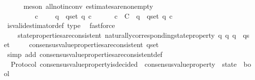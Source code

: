 \begin{isabellebody}
\ \ \ \ \isamarkupfalse%
\ {\isacharparenleft}meson\ all{\isacharunderscore}not{\isacharunderscore}in{\isacharunderscore}conv\ estimates{\isacharunderscore}are{\isacharunderscore}non{\isacharunderscore}empty{\isacharparenright}\isanewline
\ \ \isamarkupfalse%
\ \isamarkupfalse%
\isanewline
\ \ \ \ {\isachardoublequoteopen}{\isacharparenleft}{\isasymexists}\ {\isasymsigma}\ {\isasymin}\ {\isasymSigma}{\isachardot}\ {\isasymexists}\ c\ {\isasymin}\ {\isasymepsilon}\ {\isasymsigma}{\isachardot}\ {\isasymforall}\ q\ {\isasymin}\ q{\isacharunderscore}set{\isachardot}\ q\ c{\isacharparenright}\isanewline
\ \ \ \ {\isasymlongrightarrow}\ {\isacharparenleft}{\isasymexists}\ c\ {\isasymin}\ C{\isachardot}\ {\isasymforall}\ q{\isacharprime}\ {\isasymin}\ q{\isacharunderscore}set{\isachardot}\ q{\isacharprime}\ c{\isacharparenright}{\isachardoublequoteclose}\isanewline
\ \ \ \ \isamarkupfalse%
\ is{\isacharunderscore}valid{\isacharunderscore}estimator{\isacharunderscore}def\ {\isasymepsilon}{\isacharunderscore}type\ \isamarkupfalse%
\ fastforce\isanewline
\ \ \isamarkupfalse%
\ \isamarkupfalse%
\isanewline
\ \ \ \ {\isachardoublequoteopen}state{\isacharunderscore}properties{\isacharunderscore}are{\isacharunderscore}consistent\ {\isacharbraceleft}naturally{\isacharunderscore}corresponding{\isacharunderscore}state{\isacharunderscore}property\ q\ {\isacharbar}q{\isachardot}\ q\ {\isasymin}\ q{\isacharunderscore}set{\isacharbraceright}\isanewline
\ \ \ \ {\isasymLongrightarrow}\ consensus{\isacharunderscore}value{\isacharunderscore}properties{\isacharunderscore}are{\isacharunderscore}consistent\ q{\isacharunderscore}set{\isachardoublequoteclose}\isanewline
\ \ \ \ \isamarkupfalse%
\ {\isacharparenleft}simp\ add{\isacharcolon}\ consensus{\isacharunderscore}value{\isacharunderscore}properties{\isacharunderscore}are{\isacharunderscore}consistent{\isacharunderscore}def{\isacharparenright}\isanewline
{}\isamarkupfalse%
%
\endisatagproof
{\isafoldproof}%
%
\isadelimproof
\isanewline
%
\endisadelimproof
\isanewline
\isanewline
{}\isamarkupfalse%
\ {\isacharparenleft}\ Protocol{\isacharparenright}\ consensus{\isacharunderscore}value{\isacharunderscore}property{\isacharunderscore}is{\isacharunderscore}decided\ {\isacharcolon}{\isacharcolon}\ {\isachardoublequoteopen}{\isacharparenleft}consensus{\isacharunderscore}value{\isacharunderscore}property\ {\isacharasterisk}\ state{\isacharparenright}\ {\isasymRightarrow}\ bool{\isachardoublequoteclose}\isanewline

\end{isabellebody}
